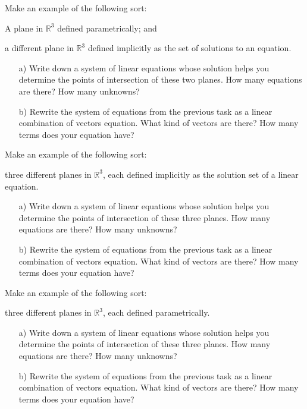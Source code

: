 \documentclass[cahier-main.tex]{subfiles}
\begin{document}
\begin{task}
Make an example of the following sort:
\begin{compactitem}
\item A plane in $\mathbb{R}^3$ defined parametrically; and
\item a different plane in $\mathbb{R}^3$ defined implicitly as the set of solutions to an equation.
\end{compactitem}
\begin{enumerate}
\item[a)] Write down a system of linear equations whose solution helps you determine the points of intersection of these two planes. How many equations are there? How many unknowns?

\item[b)] Rewrite the system of equations from the previous task as a linear combination of vectors equation. What kind of vectors are there? How many terms does your equation have?
\end{enumerate}
\end{task}


\begin{task}
Make an example of the following sort:
\begin{compactitem}
\item three different planes in $\mathbb{R}^3$, each defined implicitly as the solution set of a linear equation.
\end{compactitem}
\begin{enumerate}
\item[a)] Write down a system of linear equations whose solution helps you determine the points of intersection of these three planes. How many equations are there? How many unknowns?

\item[b)] Rewrite the system of equations from the previous task as a linear combination of vectors equation. What kind of vectors are there? How many terms does your equation have?
\end{enumerate}
\end{task}

\begin{task}
Make an example of the following sort:
\begin{compactitem}
\item three different planes in $\mathbb{R}^3$, each defined parametrically.
\end{compactitem}
\begin{enumerate}
\item[a)] Write down a system of linear equations whose solution helps you determine the points of intersection of these three planes. How many equations are there? How many unknowns?

\item[b)] Rewrite the system of equations from the previous task as a linear combination of vectors equation. What kind of vectors are there? How many terms does your equation have?
\end{enumerate}
\end{task}
\end{document}
